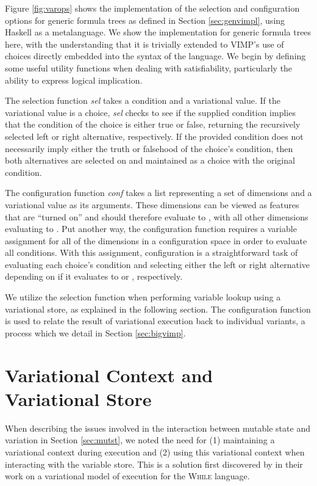 \documentclass[12pt,oneside]{book}
\begin{document}
Figure \ref{fig:varops} shows the implementation of the selection and configuration options for generic formula trees
as defined in Section \ref{sec:genvimpl}, using Haskell as a metalanguage. We show the implementation for generic formula trees
here, with the understanding that it is trivially extended to VIMP's use of choices directly embedded into the syntax of the language.
We begin by defining some useful utility functions when dealing with satisfiability, particularly the ability to express logical implication.

The selection function \emph{sel} takes a condition and a variational value. If the variational value is a choice, \emph{sel} checks to see
if the supplied condition implies that the condition of the choice is either true or false, returning the recursively selected left or right alternative, respectively.
If the provided condition does not necessarily imply either the truth or falsehood of the choice's condition, then both alternatives are selected on
and maintained as a choice with the original condition.

The configuration function \emph{conf} takes a list representing a set of dimensions and a variational value as its arguments. These dimensions can be viewed as
features that are ``turned on'' and should therefore evaluate to , with all other dimensions evaluating to . Put another way, the configuration
function requires a variable assignment for all of the dimensions in a configuration space in order to evaluate all conditions. With this assignment, configuration
is a straightforward task of evaluating each choice's condition and selecting either the left or right alternative depending on if it evaluates to  or , respectively.

We utilize the selection function when performing variable lookup using a variational store, as explained in the following section. The configuration function is used to
relate the result of variational execution back to individual variants, a process which we detail in Section \ref{sec:bigvimp}.

\section{Variational Context and Variational Store}
\label{sec:vcvs}

When describing the issues involved in the interaction between mutable state and variation in Section \ref{sec:mutst}, we noted the need for (1) maintaining a variational context
during execution and (2) using this variational context when interacting with the variable store. This is a solution first discovered by \cite{varwhile} in their work on a
variational model of execution for the \textsc{While} language.
\end{document}
